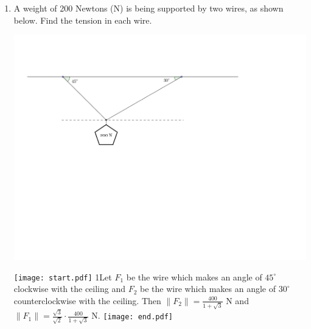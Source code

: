 \documentclass[12pt]{article}
\begin{document}
\begin{enumerate}
\newpage

\item A weight of 200 Newtons (N) is being supported by two wires, as shown below.  Find the tension in each wire.
\begin{center}
\includegraphics[scale=0.6]{vector6.pdf}
\end{center}

\texttt{[image: start.pdf]}
{{{1\linewidth}{Let $F_1$ be the wire which  makes an angle of $45^{\circ}$ clockwise with the ceiling and $F_2$ be the wire which  makes an angle of $30^{\circ}$ counterclockwise with the ceiling.  Then $\|F_2\|=\frac{400}{1+\sqrt{3}}$ N and $\|F_1\|=\frac{\sqrt{3}}{\sqrt{2}}\cdot\frac{400}{1+\sqrt{3}}$ N.}}}
\texttt{[image: end.pdf]}


\end{enumerate}
\end{document}
